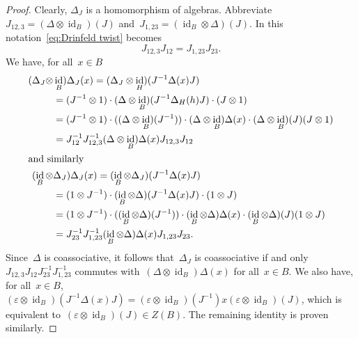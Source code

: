 \documentclass[12pt, reqno]{amsart}
\theoremstyle{definition}
\numberwithin{equation}{section}
\newcommand{\tensor}{\otimes}
\DeclareMathOperator{\id}{id}
\begin{document}
\begin{proof}
Clearly, $\Delta_J$ is a homomorphism of algebras. 
Abbreviate $J_{12,3}=(\Delta\tensor \id_B)(J)$ and~$J_{1,23}=(\id_B\tensor\Delta)(J)$. In this notation~\eqref{eq:Drinfeld twist} becomes
\begin{equation}\label{eq:Drinfeld twist'}
J_{12,3}J_{12}=J_{1,23}J_{23}.
\end{equation}
We have, for all~$x\in B$
\begin{align*}
(\Delta_J\tensor &\id_B)\Delta_J(x)=
(\Delta_J\tensor \id_H)(J^{-1}\Delta(x)J)\\
&=(J^{-1}\tensor 1)\cdot (\Delta\tensor \id_B)(J^{-1}\Delta_H(h)J)\cdot (J\tensor 1)\\
&=(J^{-1}\tensor 1)\cdot ((\Delta\tensor\id_B)(J^{-1}))\cdot (\Delta\tensor\id_B)\Delta(x)\cdot 
(\Delta\tensor\id_B)(J)(J\tensor 1)\\
&=J_{12}^{-1}J_{12,3}^{-1}(\Delta\tensor\id_B)\Delta(x)
J_{12,3}J_{12}
\\
\intertext{and similarly}
(\id_B\tensor &\Delta_J)\Delta_J(x)=
(\id_B\tensor \Delta_J)(J^{-1}\Delta(x)J)\\
&=(1\tensor J^{-1})\cdot (\id_B\tensor \Delta)(J^{-1}\Delta(x)J)\cdot (1\tensor J)\\
&=(1\tensor J^{-1})\cdot ((\id_B\tensor\Delta)(J^{-1}))\cdot (\id_B\tensor\Delta)\Delta(x)\cdot 
(\id_B\tensor\Delta)(J)(1\tensor J)\\
&=J_{23}^{-1}J_{1,23}^{-1}(\id_B\tensor\Delta)\Delta(x)
J_{1,23}J_{23}.
\end{align*}
Since~$\Delta$ is coassociative, it follows that~$\Delta_J$
is coassociative if and only $J_{12,3}J_{12}J_{23}^{-1}J_{1,23}^{-1}$
commutes with~$(\Delta\tensor\id_B)\Delta(x)$
for all~$x\in B$.
We also have, for all~$x\in B$, 
$(\varepsilon\tensor\id_B)(J^{-1}\Delta(x)J)=
(\varepsilon\tensor \id_B)(J^{-1})x (\varepsilon\tensor\id_B)(J)$, which is equivalent to~$(\varepsilon\tensor\id_B)(J)\in Z(B)$. The remaining
identity is proven similarly.


\end{proof}
\end{document}
